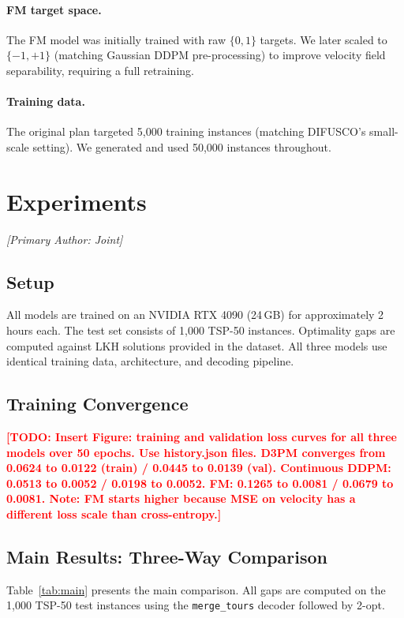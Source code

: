 \documentclass[11pt,a4paper]{article}
\newcommand{\TODO}[1]{\textcolor{red}{\textbf{[TODO: #1]}}}
\begin{document}
\paragraph{FM target space.}
The FM model was initially trained with raw $\{0,1\}$ targets. We later scaled to
$\{-1,+1\}$ (matching Gaussian DDPM pre-processing) to improve velocity field
separability, requiring a full retraining.

\paragraph{Training data.}
The original plan targeted 5{,}000 training instances (matching DIFUSCO's small-scale
setting). We generated and used 50{,}000 instances throughout.


\section{Experiments}
\label{sec:experiments}
\textit{[Primary Author: Joint]}

\subsection{Setup}
All models are trained on an NVIDIA RTX 4090 (24\,GB) for approximately 2 hours each.
The test set consists of 1{,}000 TSP-50 instances. Optimality gaps are computed against
LKH solutions provided in the dataset. All three models use identical training data,
architecture, and decoding pipeline.

\subsection{Training Convergence}
\TODO{Insert Figure: training and validation loss curves for all three models over 50 epochs.
Use history.json files. D3PM converges from 0.0624 to 0.0122 (train) / 0.0445 to 0.0139 (val).
Continuous DDPM: 0.0513 to 0.0052 / 0.0198 to 0.0052.
FM: 0.1265 to 0.0081 / 0.0679 to 0.0081.
Note: FM starts higher because MSE on velocity has a different loss scale than cross-entropy.}

\subsection{Main Results: Three-Way Comparison}
\label{sec:three_way}
Table~\ref{tab:main} presents the main comparison. All gaps are computed on the 1{,}000
TSP-50 test instances using the \texttt{merge\_tours} decoder followed by 2-opt.
\end{document}
